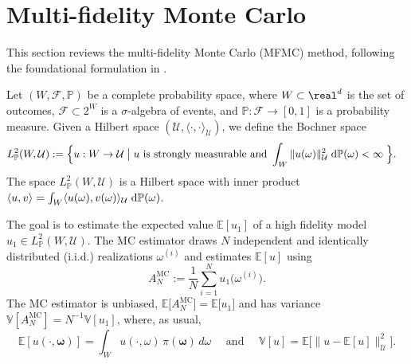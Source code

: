 \section{Multi-fidelity Monte Carlo}\label{sec:MFMC}

This section reviews the multi-fidelity Monte Carlo (MFMC) method, following the foundational formulation in \cite{BPeherstorfer_KWillcox_MDGunzburger_2016a}. 

Let $(W, \mathcal{F}, \mathbb{P})$ be a complete probability space, where
$W \subset \real^d$ is the set of outcomes, $\mathcal{F} \subset 2^{W}$ is a
$\sigma$-algebra of events, and $\mathbb{P}: \mathcal{F} \to [0,1]$ is a
probability measure. Given a Hilbert space $({\mathcal U}, \langle \cdot, \cdot \rangle_{{\mathcal U}})$, we define the Bochner space
\begin{align}     \label{eq:BochnerL2}
  L_{\mathbb{P}}^2(W, {\mathcal U}) := \Big\{ u: W \rightarrow {\mathcal U} \;\big|\; & u \mbox{ is strongly measurable and } 
                                                                  \int_W \| u(\omega) \|_{{\mathcal U}}^2 \; \textup{d}\mathbb{P}(\omega) < \infty \; \Big\}.
\end{align}
The space $ L_{\mathbb{P}}^2(W, {\mathcal U})$ is a Hilbert space with inner product 
$ \langle u, v \rangle =  \int_W  \langle  u(\omega) , v(\omega)  \rangle_{{\mathcal U}} \; \textup{d}\mathbb{P}(\omega)$.

The goal is to estimate the expected value $\mathbb{E}[u_1 ]$ of a high fidelity model $u_1 \in   L_{\mathbb{P}}^2(W, {\mathcal U})$.
The  MC estimator draws $N$ independent and identically distributed (i.i.d.) realizations $\omega^{(i)}$
and estimates $\mathbb{E}[u ]$ using
\begin{equation}\label{eq:MC_estimator}
    A^{\text{MC}}_{N} := \frac{1}{N}\sum_{i=1}^{N} u_1 \big(\omega^{(i)} \big).
\end{equation}
The MC estimator is unbiased, $\mathbb{E}\big[ A^{\text{MC}}_N \big] = \mathbb{E}\big[ u_1 \big]$
and has variance $\mathbb{V}[A^{\text{MC}}_{N}] = N^{-1} \mathbb{V}[u_1 ]$, where, as usual,
\begin{equation}   \label{eq:variance_of_u}
           \mathbb{E}\left[u(\cdot,\boldsymbol \omega)\right]=\int_W u(\cdot,\omega) \, \pi(\boldsymbol\omega) \,d\omega
           \quad \mbox{ and } \quad
           \mathbb{V}[u] = \mathbb{E}\Big[  \big\| u - \mathbb{E}[u]  \big\|_{{\mathcal U}}^2 \Big].
  \end{equation}




